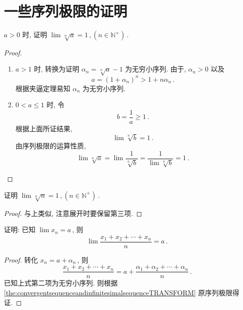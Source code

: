 \documentclass{book}
\newcommand{\N}{\mathbb{N}}
\renewcommand{\ge}{\geqslant}
\renewcommand{\le}{\leqslant}
\numberwithin{equation}{section}
\numberwithin{figure}{section}
\theoremstyle{definition}
\begin{document}
\section{一些序列极限的证明}
\label{proof:ConvergentSequences}
$a>0$ 时, 证明 $\lim\sqrt[n]{a}=1\,,(n\in\N^+)$\,.
\begin{proof}
  \begin{enumerate}
    \item %
      $a>1$ 时, 转换为证明 $\alpha_n=\sqrt[n]{a}-1$ 为无穷小序列.
      由于, $\alpha_n>0$ 以及
      \begin{equation*}
	a=(1+\alpha_n)^n>1+n\alpha_n\,.
      \end{equation*}
      根据夹逼定理易知 $\alpha_n$ 为无穷小序列.
    \item $0<a\le1$ 时, 令
      \begin{equation*}
	b=\frac{1}{a}\ge1\,.
      \end{equation*}
      根据上面所证结果,
      \begin{equation*}
	\lim\sqrt[n]{b}=1\,.
      \end{equation*}
      由序列极限的运算性质,
      \begin{equation*}
	\lim\sqrt[n]{a}=\lim\frac{1}{\sqrt[n]{b}}=\frac{1}{\lim\sqrt[n]{b}}=1\,.
      \end{equation*}
  \end{enumerate}
\end{proof}

证明 $\lim \sqrt[n]{n}=1\,,(n\in\N^+)$\,.
\begin{proof}
  与上类似, 注意展开时要保留第三项.
\end{proof}

证明: 已知 $\lim x_n=a$\,, 则
\begin{equation*}
  \lim\frac{x_1+x_2+\cdots+x_n}{n}=a\,.
\end{equation*}
\begin{proof}
  转化 $x_n=a+\alpha_n$\,, 则
  \begin{equation*}
    \frac{x_1+x_2+\cdots+x_n}{n}=a+\frac{\alpha_1+\alpha_2+\cdots+\alpha_n}{n}\,.
  \end{equation*}
  已知上式第二项为无穷小序列. 则根据 \cref{the:convergentsequenceandinfinitesimalsequenceTRANSFORM} 原序列极限得证.
\end{proof}
\end{document}
